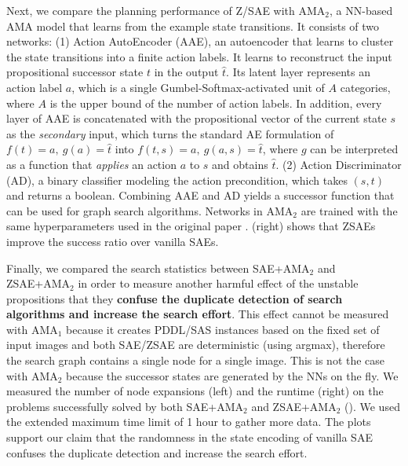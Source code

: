 Next, we compare the planning performance of Z/SAE with AMA$_2$,
a NN-based AMA model that learns from the example state transitions.
It consists of two networks:
(1) Action AutoEncoder (AAE), an autoencoder that learns to cluster the state transitions into a finite action labels.
It learns to reconstruct the input propositional successor state $t$ in the output $\hat{t}$.
Its latent layer represents an action label $a$, which is a single Gumbel-Softmax-activated unit of $A$ categories,
where $A$ is the upper bound of the number of action labels.
In addition, every layer of AAE is concatenated with the propositional vector of the current state $s$ as the \emph{secondary} input,
which turns the standard AE formulation of $f(t)=a,\ g(a)=\hat{t}$ into $f(t,s)=a,\ g(a,s)=\hat{t}$,
where $g$ can be interpreted as a function that \emph{applies} an action $a$ to $s$ and obtains $\hat{t}$.
(2) Action Discriminator (AD), a binary classifier modeling the action precondition, which takes $(s,t)$ and returns a boolean.
Combining AAE and AD yields a successor function that can be used for graph search algorithms.
Networks in AMA$_2$ are trained with the same hyperparameters used in the original paper \cite{Asai2018}.
 (right) shows that ZSAEs improve the success ratio over vanilla SAEs.

Finally, we compared the search statistics between SAE+AMA$_2$ and ZSAE+AMA$_2$
in order to measure another harmful effect of the unstable propositions
that they \textbf{confuse the duplicate detection of search algorithms and increase the search effort}.
% 
This effect cannot be measured with AMA$_1$
because it creates PDDL/SAS instances based on the fixed set of
input images and both SAE/ZSAE are deterministic (using argmax),
therefore the search graph contains a single node for a single image.
This is not the case with AMA$_2$ because the successor states
are generated by the NNs on the fly.
% 
We measured the number of node expansions (left) and the runtime (right)
on the problems successfully solved by both SAE+AMA$_2$ and ZSAE+AMA$_2$ ().
We used the extended maximum time limit of 1 hour to gather more data.
The plots support our claim that
the randomness in the state encoding of vanilla SAE confuses the duplicate detection and
increase the search effort.


